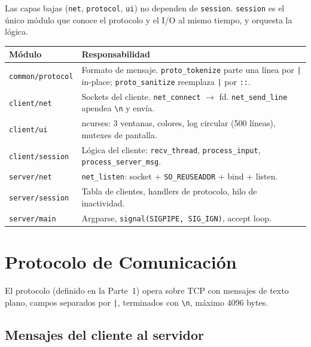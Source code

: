 \documentclass[12pt,a4paper]{article}
\begin{document}
Las capas bajas (\texttt{net}, \texttt{protocol}, \texttt{ui}) no dependen de
\texttt{session}.  \texttt{session} es el único módulo que conoce el protocolo y el
I/O al mismo tiempo, y orquesta la lógica.

\begin{center}
\begin{tabular}{lp{10cm}}
\toprule
\textbf{Módulo} & \textbf{Responsabilidad} \\
\midrule
\texttt{common/protocol} & Formato de mensaje.  \texttt{proto\_tokenize} parte una línea por \texttt{|} in-place; \texttt{proto\_sanitize} reemplaza \texttt{|} por \texttt{::}. \\
\texttt{client/net} & Sockets del cliente.  \texttt{net\_connect} $\to$ fd.  \texttt{net\_send\_line} apendea \texttt{\textbackslash n} y envía. \\
\texttt{client/ui} & ncurses: 3 ventanas, colores, log circular (500 líneas), mutexes de pantalla. \\
\texttt{client/session} & Lógica del cliente: \texttt{recv\_thread}, \texttt{process\_input}, \texttt{process\_server\_msg}. \\
\texttt{server/net} & \texttt{net\_listen}: socket + \texttt{SO\_REUSEADDR} + bind + listen. \\
\texttt{server/session} & Tabla de clientes, handlers de protocolo, hilo de inactividad. \\
\texttt{server/main} & Argparse, \texttt{signal(SIGPIPE, SIG\_IGN)}, accept loop. \\
\bottomrule
\end{tabular}
\end{center}

\section{Protocolo de Comunicación}
\label{sec:protocolo}

El protocolo (definido en la Parte~1) opera sobre TCP con mensajes de texto plano,
campos separados por \texttt{|}, terminados con \texttt{\textbackslash n}, máximo
4096 bytes.

\subsection{Mensajes del cliente al servidor}
\end{document}
